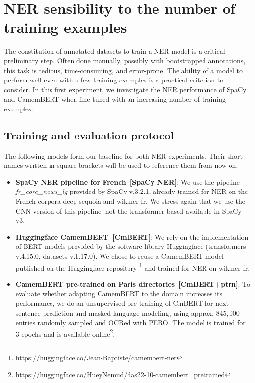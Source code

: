\section{NER sensibility to the number of training examples}
\label{sec:ner-xp1}
The constitution of annotated datasets to train a NER model is a critical preliminary step.
Often done manually, possibly with bootstrapped annotations, this task is tedious, time-consuming, and error-prone.
The ability of a model to perform well even with a few training examples is a practical criterion to consider.
In this first experiment, we investigate the NER performance of SpaCy and CamemBERT when fine-tuned with an increasing number of training examples.

\subsection{Training and evaluation protocol}
\label{sec:ner-xp1-protocol}
The following models form our baseline for both NER experiments.
Their short names written in square brackets will be used to reference them from now on.
\begin{itemize}
    \item \textbf{SpaCy NER pipeline for French~[SpaCy NER]}: We use the pipeline \textit{fr\_core\_news\_lg} provided by SpaCy v.3.2.1, already trained for NER on the French corpora deep-sequoia and wikiner-fr.
    We stress again that we use the CNN version of this pipeline, not the transformer-based available in SpaCy v3.
    \item \textbf{Huggingface CamemBERT~[CmBERT]}: We rely on the implementation of BERT models provided by the software library Huggingface (transformers v.4.15.0, datasets v.1.17.0).
We chose to reuse a CamemBERT model published on the Huggingface repository \footnote{\url{https://huggingface.co/Jean-Baptiste/camembert-ner}} and trained for NER on wikiner-fr.
\item \textbf{CamemBERT pre-trained on Paris directories~[CmBERT+ptrn]}: 
To evaluate whether adapting CamemBERT to the domain increases its performance, we do an unsupervised pre-training of CmBERT for next sentence prediction and masked language modeling, using approx. $845,000$ entries randomly sampled and OCRed with PERO.
The model is trained for 3 epochs and is available online\footnote{\url{https://huggingface.co/HueyNemud/das22-10-camembert_pretrained}}.
\end{itemize}

